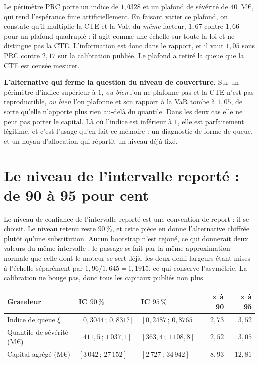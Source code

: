 Le périmètre PRC porte un indice de $1{,}0328$ et un plafond de sévérité de $40$~M\euro, qui rend
l'espérance finie artificiellement. En faisant varier ce plafond, on constate qu'il multiplie la
CTE et la VaR du \emph{même} facteur, $1{,}67$ contre $1{,}66$ pour un plafond quadruplé : il agit
comme une échelle sur toute la loi et ne distingue pas la CTE. L'information est donc dans le
rapport, et il vaut $1{,}05$ sous PRC contre $2{,}17$ sur la calibration publiée. Le plafond a
retiré la queue que la CTE est censée mesurer.

\begin{cle}
\textbf{L'alternative qui ferme la question du niveau de couverture.} Sur un périmètre d'indice
supérieur à $1$, \emph{ou bien} l'on ne plafonne pas et la CTE n'est pas reproductible, \emph{ou
bien} l'on plafonne et son rapport à la VaR tombe à $1{,}05$, de sorte qu'elle n'apporte plus rien
au-delà du quantile. Dans les deux cas elle ne peut pas porter le capital. Là où l'indice est
inférieur à $1$, elle est parfaitement légitime, et c'est l'usage qu'en fait ce mémoire : un
diagnostic de forme de queue, et un noyau d'allocation qui répartit un niveau déjà fixé.
\end{cle}

\section{Le niveau de l'intervalle reporté : de 90 à 95 pour cent}
\label{sec:ann-intervalle95}

Le niveau de confiance de l'intervalle reporté est une convention de report : il se choisit. Le
niveau retenu reste $90\,\%$, et cette pièce en donne l'alternative chiffrée plutôt qu'une
substitution. Aucun bootstrap n'est rejoué, ce qui donnerait deux valeurs du même intervalle : le
passage se fait par la même approximation normale que celle dont le moteur se sert déjà, les deux
demi-largeurs étant mises à l'échelle séparément par $1{,}96/1{,}645 = 1{,}1915$, ce qui conserve
l'asymétrie. La calibration ne bouge pas, donc tous les capitaux publiés non plus.

\begin{center}\footnotesize
\renewcommand{\arraystretch}{1.25}
\begin{tabular}{@{}l l l r r@{}}
\toprule
\textbf{Grandeur} & \textbf{IC $90\,\%$} & \textbf{IC $95\,\%$} & \textbf{$\times$ à 90} & \textbf{$\times$ à 95} \\
\midrule
Indice de queue $\xi$ & $[0{,}3044\,;\,0{,}8313]$ & $[0{,}2487\,;\,0{,}8765]$ & $2{,}73$ & $3{,}52$ \\
Quantile de sévérité (M\euro) & $[411{,}5\,;\,1\,037{,}1]$ & $[363{,}4\,;\,1\,108{,}8]$ & $2{,}52$ & $3{,}05$ \\
Capital agrégé (M\euro) & $[3\,042\,;\,27\,152]$ & $[2\,727\,;\,34\,942]$ & $8{,}93$ & $12{,}81$ \\
\bottomrule
\end{tabular}
\end{center}

